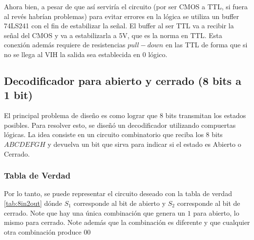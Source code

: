 \documentclass[12pt,a4paper]{article}
\begin{document}
Ahora bien, a pesar de que así serviría el circuito (por ser CMOS a TTL, si fuera al revés habrían problemas) para evitar errores en la lógica se utiliza un buffer 74LS241 con el fin de estabilizar la señal. El buffer al ser TTL va a recibir la señal del CMOS y va a estabilizarla a 5V, que es la norma en TTL. Esta conexión además requiere de resistencias $pull-down$ en las TTL de forma que si no se llega al VIH la salida sea establecida en 0 lógico. 


\subsection{Decodificador para abierto y cerrado (8 bits a 1 bit)}

El principal problema de diseño es como lograr que 8 bits transmitan los estados posibles. Para resolver esto, se diseñó un decodificador utilizando compuertas lógicas. La idea consiste en un circuito combinatorio que reciba los 8 bits $ABCD EFGH$ y devuelva un bit que sirva para indicar si el estado es Abierto o Cerrado. 

\subsubsection{Tabla de Verdad}

Por lo tanto, se puede representar el circuito deseado con la tabla de verdad \ref{tab:8in2out} dónde $S_1$ corresponde al bit de abierto y $S_2$ corresponde al bit de cerrado. Note que hay una única combinación que genera un $1$ para abierto, lo mismo para cerrado. Note además que la combinación es diferente y que cualquier otra combinación produce $00$ \\
\end{document}
